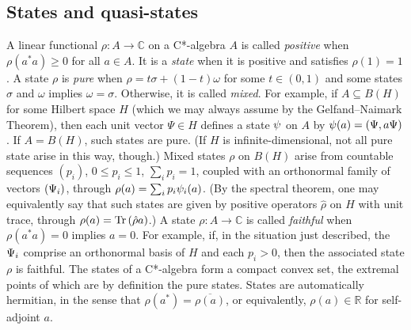 \documentclass[12pt]{article}
\newcommand{\Tr}{\mbox{\rm Tr}\,} \newcommand{\Ad}{{\rm Ad}}
\newcommand{\rh}{\rho} \newcommand{\sg}{\sigma}
\newcommand{\om}{\omega} \newcommand{\Om}{\Omega}
\newcommand{\alg}[1]{\ensuremath{#1}}
\newcommand{\field}[1]{\ensuremath{\mathbb{#1}}}
\begin{document}
\subsection{States and quasi-states}\label{subsec:qs}
A linear functional $\rho:A \to
\field{C}$ on a C*-algebra $A$ is called \emph{positive} when
$\rho(a^*a) \geq 0$ for all $a \in \alg{A}$. It is a {\it state} when
it is positive and satisfies $\rho(1)=1$. A state $\rh$ is \emph{pure} when
$\rh=t \sg + (1-t)\om$ for some $t\in (0,1)$ and some states $\sg$ and $\om$
implies
$\om=\sg$. Otherwise, it is called \emph{mixed}.
For example, if $A\subseteq B(H)$ for some Hilbert space $H$ (which we may
always assume by the Gelfand--Naimark Theorem), then each unit vector $\Psi\in
H$ defines a state $\psi$ on $A$
by $\psi(a)=(\Psi, a\Psi)$. If $A=B(H)$, such states are pure. (If $H$ is
infinite-dimensional, not all pure state arise in this way, though.) Mixed
states $\rh$ on $B(H)$
arise from countable sequences $(p_i)$, $0\leqslant p_i\leqslant 1$, $\sum_i p_i=1$,
coupled with
an orthonormal family of vectors $(\Psi_i)$, through $\rh(a)=\sum_i p_i
\ps_i(a)$.
(By the spectral theorem, one may equivalently say that such states
are given by positive operators $\hat{\rh}$ on $H$ with unit trace,
through $\rh(a)=\Tr (\hat{\rh} a)$.)
  A state $\rho:\alg{A}\to\field{C}$ is called
\emph{faithful} when $\rho(a^*a)=0$ implies $a=0$. For example, if, in the
situation just described, the $\Psi_i$ comprise an orthonormal basis of $H$ and
each  $p_i>0$, then
the associated state $\rh$ is faithful.
The states of a
C*-algebra form a compact convex set, the extremal points of which are by
definition the
pure states. States are automatically
hermitian, in the sense that $\rho(a^*) = \overline{\rho(a)}$, or
equivalently, $\rho(a) \in \field{R}$ for self-adjoint
$a$.
\end{document}
